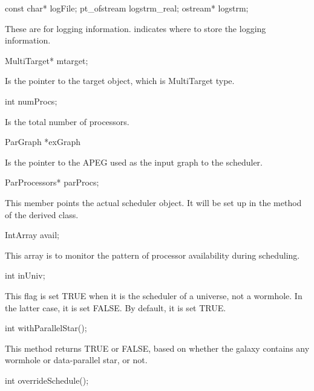 \begin{example}
const char* logFile;
pt_ofstream logstrm_real;
ostream* logstrm;
\end{example}

These are for logging information.  indicates where to store
the logging information.

\begin{example}
MultiTarget* mtarget;
\end{example}

Is the pointer to the target object, which is MultiTarget type.

\begin{example}
int numProcs;
\end{example}

Is the total number of processors.

\begin{example}
ParGraph *exGraph
\end{example}

Is the pointer to the APEG used as the input graph to the scheduler.

\begin{example}
ParProcessors* parProcs;
\end{example}

This member points the actual scheduler object. It will be set up in the
 method of the derived class.

\begin{example}
IntArray avail;
\end{example}

This array is to monitor the pattern of processor availability 
during scheduling.

\begin{example}
int inUniv;
\end{example}

This flag is set TRUE when it is the scheduler of a universe, not a wormhole.
In the latter case, it is set FALSE. By default, it is set TRUE.

\begin{example} 
int withParallelStar();
\end{example}

This method returns TRUE or FALSE, based on whether the galaxy contains 
any wormhole or data-parallel star, or not.

\begin{example}
int overrideSchedule();
\end{example}

